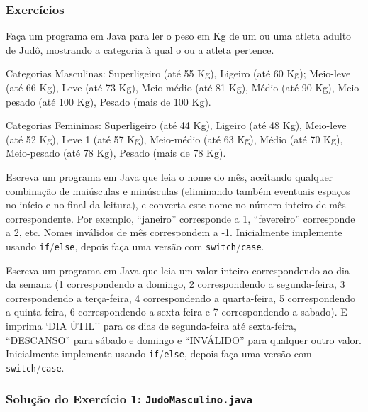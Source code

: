 \documentclass[xcolor={dvipsnames,table},aspectratio=169]{beamer}
\begin{document}
\begin{frame}\frametitle{Exercícios}
\begin{enumerate}
{\footnotesize
	\item Faça um programa em Java para ler o peso em Kg de um ou uma atleta adulto de Judô, mostrando a categoria à qual o ou a atleta pertence.\\
	\begin{itemize}
{\scriptsize
		\item Categorias Masculinas: Superligeiro (até 55 Kg), Ligeiro (até 60 Kg); Meio-leve (até 66 Kg), Leve (até 73 Kg), Meio-médio (até 81 Kg), Médio (até 90 Kg), Meio-pesado (até 100 Kg), Pesado (mais de 100 Kg).\\
		\item Categorias Femininas: Superligeiro (até 44 Kg), Ligeiro (até 48 Kg), Meio-leve (até 52 Kg), Leve 1
(até 57 Kg), Meio-médio (até 63 Kg), Médio (até 70 Kg), Meio-pesado (até 78 Kg), Pesado (mais de 78 Kg).\\
}
	\end{itemize}
	\item Escreva um programa em Java que leia o nome do mês, aceitando qualquer combinação de maiúsculas e minúsculas (eliminando também eventuais espaços no início e no final da leitura), e converta este nome no número inteiro de mês correspondente. Por exemplo, ``janeiro'' corresponde a 1, ``fevereiro'' corresponde a 2, etc. Nomes inválidos de mês correspondem a -1. Inicialmente implemente usando \texttt{if}/\texttt{else}, depois faça uma versão com \texttt{switch}/\texttt{case}.\\
	\item Escreva um programa em Java que leia um valor inteiro correspondendo ao dia da semana (1 correspondendo a domingo, 2 correspondendo a segunda-feira, 3 correspondendo a terça-feira, 4 correspondendo a quarta-feira, 5 correspondendo a quinta-feira, 6 correspondendo a sexta-feira e 7 correspondendo a sabado). E imprima `DIA ÚTIL'' para os dias de segunda-feira até sexta-feira, ``DESCANSO'' para sábado e domingo e ``INVÁLIDO'' para qualquer outro valor. Inicialmente implemente usando \texttt{if}/\texttt{else}, depois faça uma versão com \texttt{switch}/\texttt{case}.\\
}
\end{enumerate}
\end{frame}

\begin{frame}\frametitle{Solução do Exercício 1: \texttt{JudoMasculino.java}}
	\scriptsize{\inputminted[bgcolor=cyan!10]{java}{src/JudoMasculino.java}}
\end{frame}
\end{document}
